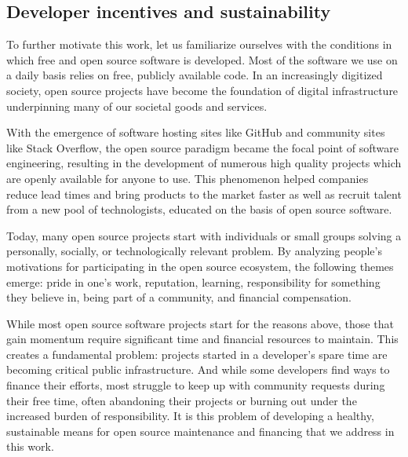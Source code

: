 \subsection{Developer incentives and sustainability}
\label{s:incentives}

To further motivate this work, let us familiarize ourselves with the
conditions in which free and open source software is developed. Most of the
software we use on a daily basis relies on free, publicly available code. In an
increasingly digitized society, open source projects have become the
foundation of digital infrastructure underpinning many of our societal goods
and services.

With the emergence of software hosting sites like GitHub and community sites
like Stack Overflow, the open source paradigm became the focal point of
software engineering, resulting in the development of numerous high quality
projects which are openly available for anyone to use. This phenomenon helped
companies reduce lead times and bring products to the market faster as well as
recruit talent from a new pool of technologists, educated on the basis of
open source software.

Today, many open source projects start with individuals or small groups
solving a personally, socially, or technologically relevant problem. By
analyzing people's motivations for participating in the open source ecosystem,
the following themes emerge: pride in one's work, reputation, learning,
responsibility for something they believe in, being part of a community, and
financial compensation.

While most open source software projects start for the reasons above, those
that gain momentum require significant time and financial resources to maintain.
This creates a fundamental problem: projects started in a developer's
spare time are becoming critical public infrastructure. And while some developers
find ways to finance their efforts, most struggle to keep up with community
requests during their free time, often abandoning their projects or
burning out under the increased burden of responsibility. It is this problem of
developing a healthy, sustainable means for open source maintenance and
financing that we address in this work.
